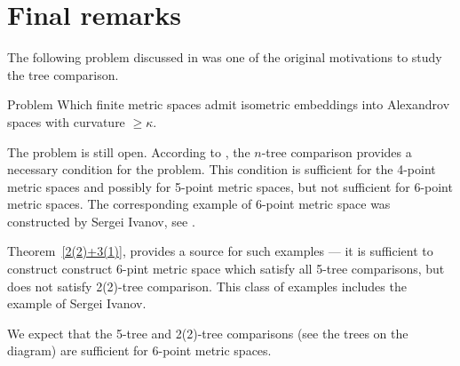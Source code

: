 \section{Final remarks}

The following problem discussed in \cite{AKP} was one of the original motivations to study the tree comparison.

\begin{thm}{Problem}
Which finite metric spaces admit isometric embeddings into Alexandrov spaces with curvature $\ge \kappa$.
\end{thm}

The problem is still open.
According to \cite[4.1]{AKP}, the $n$-tree comparison provides a necessary condition for the problem.
This condition is sufficient for the 4-point metric spaces and possibly for 5-point metric spaces, but not sufficient for 6-point metric spaces.
The corresponding example of 6-point metric space was constructed by Sergei Ivanov, see \cite{AKP}.

Theorem~\ref{2(2)+3(1)}, provides a source for such examples --- it is sufficient to construct construct 6-pint metric space which satisfy all 5-tree comparisons, but does not satisfy 2(2)-tree comparison.
This class of examples includes the example of Sergei Ivanov.

We expect that the 5-tree and 2(2)-tree comparisons (see the trees on the diagram) are sufficient for 6-point metric spaces. 
\hide
\begin{center}
\hskip10mm
\end{center}
\unhide